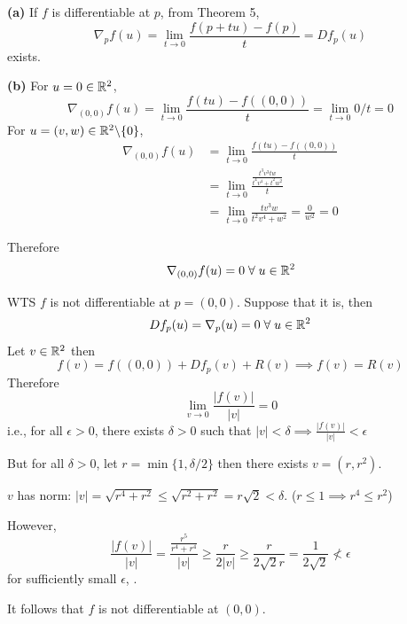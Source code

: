 \documentclass[a4paper, 12pt]{article}
\begin{document}
\begin{solution}
    \textbf{(a)} If $f$ is differentiable at $p$, from Theorem 5, \[
        \nabla_p f(u) = \lim_{t\to 0} \frac{f(p + tu) - f(p)}{t} = Df_p(u)
    \] exists.

    \textbf{(b)}
    For $u = 0 \in \mathbb{R}^2$, \[
        \nabla_{(0, 0)}f(u) = \lim_{t \to 0} \frac{f(tu) - f((0, 0))}{t} = \lim_{t \to 0} 0/t= 0
    \]
    For $u = (v, w)\in \mathbb{R}^2 \backslash \{0\} $,
    \begin{align*}
        \nabla_{(0, 0)}f(u) & = \lim_{t \to 0} \frac{f(tu) - f((0, 0))}{t}                    \\
                            & = \lim_{t \to 0}\frac{\frac{t^3v^3tw}{t^4v^4 + t^2w^2}}{t}      \\
                            & = \lim_{t \to 0} \frac{tv^3w}{t^2v^4 + w^2} = \frac{0}{w^2} = 0
    \end{align*}

    Therefore \[
        \nabla_{(0, 0)}f(u) = 0 \forall u \in \bbr^2
    \]

    WTS $f$ is not differentiable at $p = (0, 0)$. Suppose that it is, then \[
        Df_p(u) = \nabla_p(u) = 0 \forall u \in \bbr^2
    \]
    Let $v \in \mathbb{R}^2$ then \[
        f(v) = f((0, 0)) + Df_p(v) + R(v) \implies f(v) = R(v)
    \]
    Therefore \[
        \lim_{v \to 0}\frac{|f(v)|}{|v|} = 0
    \]
    i.e., for all $\epsilon > 0$,  there exists $\delta > 0$ such that $|v| < \delta \implies \frac{|f(v)|}{|v|}  < \epsilon$

    But for all $\delta > 0$, let $r = \min\{1, \delta /2\}$ then there exists $v = (r, r^2)$.

    $v$ has norm: $|v| = \sqrt{r^4 + r^2} \leq \sqrt{r^2 + r^2} = r\sqrt{2} < \delta$. ($r \leq 1 \implies r^4 \leq r^2$)

    However, \[
        \frac{|f(v)|}{|v|} = \frac{\frac{r^5}{r^4 + r^4}}{|v|} \geq \frac{r}{2|v|} \geq \frac{r}{2\sqrt{2}r}  = \frac{1}{2\sqrt{2}} \not < \epsilon
    \]
    for sufficiently small $\epsilon$, \contra.

    It follows that $f$ is not differentiable at $(0, 0)$.
\end{solution}
\end{document}
